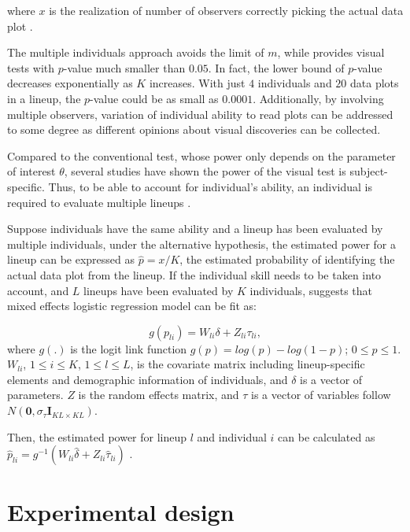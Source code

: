 \documentclass[]{interact}
\theoremstyle{plain}%
\theoremstyle{definition}
\theoremstyle{remark}
\begin{document}
where \(x\) is the realization of number of observers correctly picking
the actual data plot \citep{majumder_validation_2013}.

The multiple individuals approach avoids the limit of \(m\), while
provides visual tests with \(p\)-value much smaller than \(0.05\). In
fact, the lower bound of \(p\)-value decreases exponentially as \(K\)
increases. With just \(4\) individuals and \(20\) data plots in a
lineup, the \(p\)-value could be as small as \(0.0001\). Additionally,
by involving multiple observers, variation of individual ability to read
plots can be addressed to some degree as different opinions about visual
discoveries can be collected.

Compared to the conventional test, whose power only depends on the
parameter of interest \(\theta\), several studies
\citep[see][]{hofmann_graphical_2012, majumder_validation_2013, majumder_human_2014, roy_chowdhury_using_2015, loy_variations_2016}
have shown the power of the visual test is subject-specific. Thus, to be
able to account for individual's ability, an individual is required to
evaluate multiple lineups \citep{majumder_validation_2013}.

Suppose individuals have the same ability and a lineup has been
evaluated by multiple individuals, under the alternative hypothesis, the
estimated power for a lineup can be expressed as \(\hat{p} = x/K\), the
estimated probability of identifying the actual data plot from the
lineup. If the individual skill needs to be taken into account, and
\(L\) lineups have been evaluated by \(K\) individuals,
\citet{majumder_validation_2013} suggests that mixed effects logistic
regression model can be fit as:

\[g(p_{li}) = W_{li}\delta + Z_{li}\tau_{li},\] where \(g(.)\) is the
logit link function \(g(p) = log(p) - log(1-p)\); \(0 \leq p \leq 1\).
\(W_{li}\), \(1 \leq i \leq K\), \(1 \leq l \leq L\), is the covariate
matrix including lineup-specific elements and demographic information of
individuals, and \(\delta\) is a vector of parameters. \(Z\) is the
random effects matrix, and \(\tau\) is a vector of variables follow
\(N(\boldsymbol{0},\sigma_{\tau}\boldsymbol{I}_{KL\times KL})\).

Then, the estimated power for lineup \(l\) and individual \(i\) can be
calculated as
\(\hat{p}_{li} = g^{-1}(W_{li}\hat{\delta} + Z_{li}\hat{\tau}_{li})\)
\citep{majumder_validation_2013}.

\hypertarget{experimental-design}{%
\section{Experimental design}\label{experimental-design}}
\end{document}
